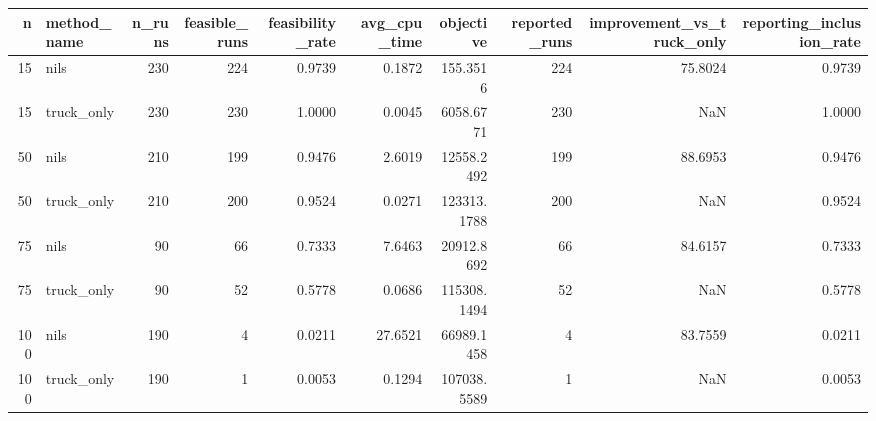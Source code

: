 \begin{tabular}{rlrrrrrrrr}
\toprule
n & method_name & n_runs & feasible_runs & feasibility_rate & avg_cpu_time & objective & reported_runs & improvement_vs_truck_only & reporting_inclusion_rate \\
\midrule
15 & nils & 230 & 224 & 0.9739 & 0.1872 & 155.3516 & 224 & 75.8024 & 0.9739 \\
15 & truck_only & 230 & 230 & 1.0000 & 0.0045 & 6058.6771 & 230 & NaN & 1.0000 \\
50 & nils & 210 & 199 & 0.9476 & 2.6019 & 12558.2492 & 199 & 88.6953 & 0.9476 \\
50 & truck_only & 210 & 200 & 0.9524 & 0.0271 & 123313.1788 & 200 & NaN & 0.9524 \\
75 & nils & 90 & 66 & 0.7333 & 7.6463 & 20912.8692 & 66 & 84.6157 & 0.7333 \\
75 & truck_only & 90 & 52 & 0.5778 & 0.0686 & 115308.1494 & 52 & NaN & 0.5778 \\
100 & nils & 190 & 4 & 0.0211 & 27.6521 & 66989.1458 & 4 & 83.7559 & 0.0211 \\
100 & truck_only & 190 & 1 & 0.0053 & 0.1294 & 107038.5589 & 1 & NaN & 0.0053 \\
\bottomrule
\end{tabular}

